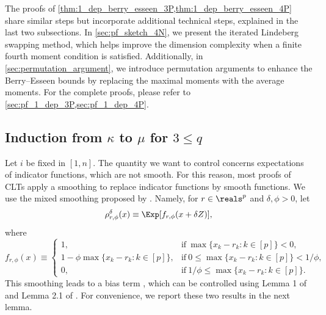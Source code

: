 \documentclass[aos]{imsart}
\begin{document}
The proofs of \cref{thm:1_dep_berry_esseen_3P,thm:1_dep_berry_esseen_4P} share similar steps but incorporate additional technical steps, explained in the last two subsections. In \cref{sec:pf_sketch_4N}, we present the iterated Lindeberg swapping method, which helps improve the dimension complexity when a finite fourth moment condition is satisfied. Additionally, in \cref{sec:permutation_argument}, we introduce permutation arguments to enhance the Berry--Esseen bounds by replacing the maximal moments with the average moments. For the complete proofs, please refer to \cref{sec:pf_1_dep_3P,sec:pf_1_dep_4P}.







\subsection{Induction from \texorpdfstring{$\kappa$}{κ} to \texorpdfstring{$\mu$}{μ} for \texorpdfstring{$3 \leq q$}{3 ≤ q}}
\label{sec:mu_by_kappa_3N}

Let $i$ be fixed in $[1,n]$. The quantity we want to control concerns expectations of indicator functions, which are not smooth. For this reason, most proofs of CLTs apply a smoothing to replace indicator functions by smooth functions. We use the mixed smoothing proposed by \citet{chernozhukov2020nearly}. Namely, for $r \in \reals^p$ and $\delta, \phi > 0$, let 
\begin{equation*}
    \rho_{r,\phi}^{\delta}(x) \equiv \Exp[ f_{r,\phi}(x + \delta Z)],
\end{equation*}
where 
\begin{equation*}
    f_{r,\phi}(x) \equiv \begin{cases}
        1, & \text{if} ~ \max\{x_k - r_k: k \in [p]\} < 0, \\
        1 - \phi \max\{ x_k - r_k: k \in [p]\},
        & \text {if} ~ 0 \leq \max\{ x_k - r_k: k \in [p]\} < 1/\phi, \\
        0, & \text{if} ~ 1/\phi \leq \max\{x_k - r_k: k \in [p]\}.
    \end{cases} 
\end{equation*}
This smoothing leads to a bias term , which can be controlled using  Lemma 1 of  and Lemma 2.1 of . For convenience, we report these two results in the next lemma.
\end{document}
